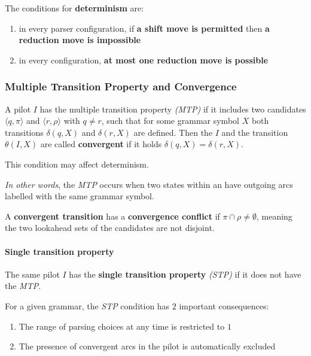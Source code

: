 \documentclass[english]{article}
\begin{document}
\bigskip
The conditions for \textbf{determinism} are:

\begin{enumerate}
  \item in every parser configuration, if \textbf{a shift move is permitted} then \textbf{a reduction move is impossible}
  \item in every configuration, \textbf{at most one reduction move is possible}
\end{enumerate}

\subsubsection{Multiple Transition Property and Convergence}
\label{sec:multiple-transition-property-and-convergence}

A pilot \mstate \(I\) has the multiple transition property \textit{(MTP)} if it includes two candidates \(\langle q, \pi \rangle\) and \(\langle r, \rho\rangle\) with \(q \neq r\), such that for some grammar symbol \(X\) both transitions \(\delta(q, X)\) and \(\delta(r, X)\) are defined.
Then the \mstate \(I\) and the transition \(\theta(I, X)\) are called \textbf{convergent} if it holds \(\delta(q, X) = \delta(r, X)\).

This condition may affect determinism.

\bigskip
\textit{In other words}, the \textit{MTP} occurs when two states within an \mstate have outgoing arcs labelled with the same grammar symbol.

A \textbf{convergent transition} has a \textbf{convergence conflict} if \(\pi \cap \rho \neq \emptyset\), meaning the two lookahead sets of the candidates are not disjoint.

\paragraph{Single transition property}
\label{par:single-transition-property}

The same pilot \mstate \(I\) has the \textbf{single transition property} \textit{(STP)} if it does not have the \textit{MTP}.

\bigskip
For a given grammar, the \textit{STP} condition has \(2\) important consequences:

\begin{enumerate}
  \item The range of parsing choices at any time is restricted to \(1\)
  \item The presence of convergent arcs in the pilot is automatically excluded
\end{enumerate}
\end{document}
